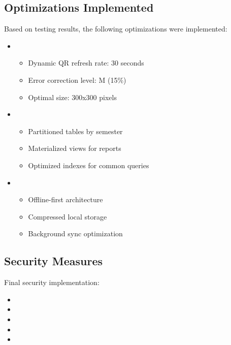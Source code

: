 \subsection{Optimizations Implemented}
\begin{notebox}
Based on testing results, the following optimizations were implemented:

\begin{itemize}
    \item {}
    \begin{itemize}
        \item Dynamic QR refresh rate: 30 seconds
        \item Error correction level: M (15\%)
        \item Optimal size: 300x300 pixels
    \end{itemize}

    \item {}
    \begin{itemize}
        \item Partitioned tables by semester
        \item Materialized views for reports
        \item Optimized indexes for common queries
    \end{itemize}

    \item {}
    \begin{itemize}
        \item Offline-first architecture
        \item Compressed local storage
        \item Background sync optimization
    \end{itemize}
\end{itemize}
\end{notebox}

\subsection{Security Measures}
\textcolor{TextBlack}{
    Final security implementation:
    \begin{itemize}
        \item {}
        \item {}
        \item {}
        \item {}
        \item {}
    \end{itemize}
}


